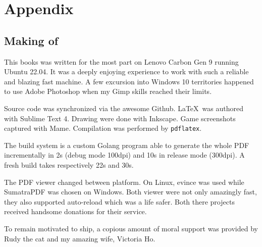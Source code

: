 \chapter{Appendix} 

\section{Making of}

This books was written for the most part on Lenovo Carbon Gen 9 running Ubuntu 22.04. It was a deeply enjoying experience to work with such a reliable and blazing fast machine. A few excursion into  Windows 10 territories happened to use Adobe Photoshop when my Gimp skills reached their limits. 

Source code was synchronized via the awesome Github. \LaTeX\ was authored with Sublime Text 4. Drawing were done with Inkscape. Game screenshots captured with Mame. Compilation was performed by \texttt{pdflatex}.

The build system is a custom Golang program able to generate the whole PDF incrementally in 2s (debug mode 100dpi) and 10s in release mode (300dpi). A fresh build takes respectively 22s and 30s.

The PDF viewer changed between platform. On Linux, evince was used while SumatraPDF was chosen on Windows. Both viewer were not only amazingly fast, they also supported auto-reload which was a life safer. Both there projects received handsome donations for their service.

To remain motivated to ship, a copious amount of moral support was provided by Rudy the cat and my amazing wife, Victoria Ho.
